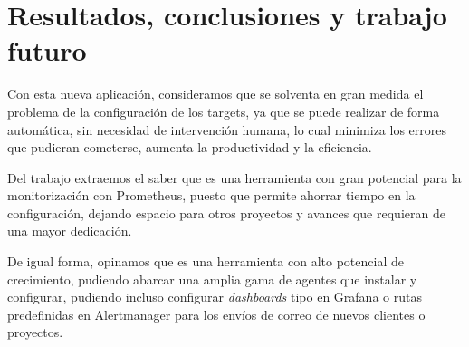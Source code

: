 \chapter{Resultados, conclusiones y trabajo futuro}

Con esta nueva aplicación, consideramos que se solventa en gran medida el problema de la configuración de los targets, ya que se puede realizar de forma automática, sin necesidad de intervención humana, lo cual minimiza los errores que pudieran cometerse, aumenta la productividad y la eficiencia.

Del trabajo extraemos el saber que es una herramienta con gran potencial para la monitorización con Prometheus, puesto que permite ahorrar tiempo en la configuración, dejando espacio para otros proyectos y avances que requieran de una mayor dedicación.

De igual forma, opinamos que es una herramienta con alto potencial de crecimiento, pudiendo abarcar una amplia gama de agentes que instalar y configurar, pudiendo incluso configurar \textit{dashboards} tipo en Grafana o rutas predefinidas en Alertmanager para los envíos de correo de nuevos clientes o proyectos.